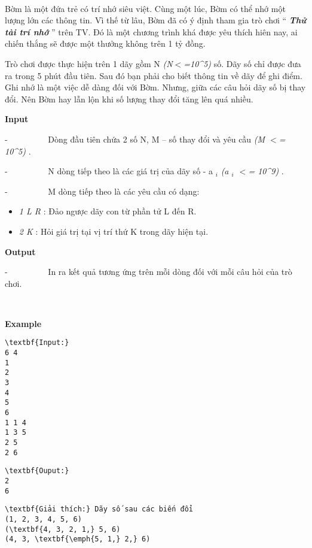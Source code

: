 

 

Bờm là một đứa trẻ có trí nhớ siêu việt. Cùng một lúc, Bờm có thể nhớ một lượng lớn các thông tin. Vì thế từ lâu, Bờm đã có ý định tham gia trò chơi “ \emph{\textbf{ Thử tài trí nhớ }} ” trên TV. Đó là một chương trình khá được yêu thích hiên nay, ai chiến thắng sẽ được một thưởng không trên 1 tỷ đồng.

Trò chơi được thực hiện trên 1 dãy gồm N \emph{ (N$<$=10\textasciicircum5) } số. Dãy số chỉ được đưa ra trong 5 phút đầu tiên. Sau đó bạn phải cho biết thông tin về dãy để ghi điểm. Ghi nhớ là một việc dễ dàng đối với Bờm. Nhưng, giữa các câu hỏi dãy số bị thay đổi. Nên Bờm hay lẫn lộn khi số lượng thay đổi tăng lên quá nhiều.

\textbf{Input }

-          Dòng đầu tiên chứa 2 số N, M – số thay đổi và yêu cầu \emph{ (M $<$= 10\textasciicircum5) } .

-          N dòng tiếp theo là các giá trị của dãy số - a $_ i $\emph{ (a $_ i $ $<$= 10\textasciicircum9) } .

-          M dòng tiếp theo là các yêu cầu có dạng:
\begin{itemize}
	\item \emph{1 L R } : Đảo ngược dãy con từ phần tử L đến R.
	\item \emph{2 K } : Hỏi giá trị tại vị trí thứ K trong dãy hiện tại.
\end{itemize}

\textbf{Output }

-          In ra kết quả tương ứng trên mỗi dòng đối với mỗi câu hỏi của trò chơi.

 

\textbf{Example }
\begin{verbatim}
\textbf{Input:}
6 4
1
2
3
4
5
6
1 1 4
1 3 5
2 5
2 6
\end{verbatim}
\begin{verbatim}
\textbf{Ouput:}
2
6\end{verbatim}
\begin{verbatim}
\textbf{Giải thích:} Dãy số sau các biến đổi
(1, 2, 3, 4, 5, 6)
(\textbf{4, 3, 2, 1,} 5, 6)
(4, 3, \textbf{\emph{5, 1,} 2,} 6)\end{verbatim}